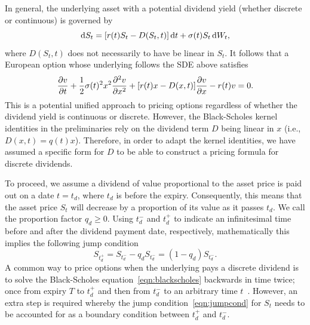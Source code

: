 In general, the underlying asset with a potential dividend yield (whether discrete or continuous) is governed by~\cite{Wilmott1995}
	\begin{equation*}
		\mathrm d S_t = [r(t)S_t - D(S_t,t)] \, \mathrm d t + \sigma(t) S_t  \, \mathrm d W_t,
	\end{equation*}
where $D(S_t,t)$ does not necessarily to have be linear in $S_t$. It follows that a European option whose underlying follows the SDE above satisfies
	\begin{equation*}
		\frac{\partial v}{\partial t} + \frac{1}{2}\sigma(t)^2x^2\frac{\partial^2 v}{\partial x^2} + [r(t)x - D(x,t)]\frac{\partial v}{\partial x} - r(t)v = 0.
	\end{equation*}
This is a potential unified approach to pricing options regardless of whether the dividend yield is continuous or discrete. However, the Black-Scholes kernel identities in the preliminaries rely on the dividend term $D$ being linear in $x$ (i.e., $D(x,t) = q(t)x$). Therefore, in order to adapt the kernel identities, we have assumed a specific form for $D$ to be able to construct a pricing formula for discrete dividends.

To proceed, we assume a dividend of value proportional to the asset price is paid out on a date $t = t_d$, where $t_d$ is before the expiry. Consequently, this means that the asset price $S_t$ will decrease by a proportion of its value as it passes $t_d$. We call the proportion factor $q_d \geq 0$. Using $t_d^-$ and $t_d^+$ to indicate an infinitesimal time before and after the dividend payment date, respectively, mathematically this implies the following jump condition
	\begin{equation}
		\label{eqn:jumpcond}
		S_{t_d^+} = S_{t_d^-} - q_dS_{t_d^-} = (1-q_d)S_{t_d^-}.
	\end{equation}
A common way to price options when the underlying pays a discrete dividend is to solve the Black-Scholes equation~\eqref{eqn:blackscholes} backwards in time twice; once from expiry $T$ to $t_d^+$ and then from $t_d^-$ to an arbitrary time $t$~\cite{Wilmott1995, Jiang2005}. However, an extra step is required whereby the jump condition~\eqref{eqn:jumpcond} for $S_t$ needs to be accounted for as a boundary condition between $t_d^+$ and $t_d^-$.

